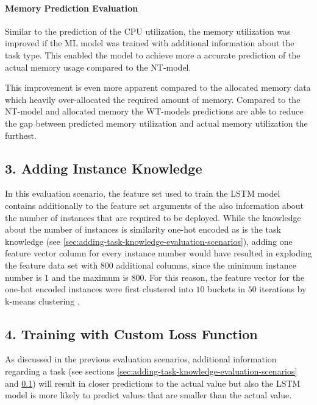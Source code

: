     \paragraph{Memory Prediction Evaluation}
    \label{par:memory-prediction-evaluation-task-knowledge}

      Similar to the prediction of the CPU utilization, the memory utilization was improved if the ML model was trained with additional information about the task type. This enabled the model to achieve more a accurate prediction of the actual memory usage compared to the NT-model.

      This improvement is even more apparent compared to the allocated memory data which heavily over-allocated the required amount of memory. Compared to the NT-model and allocated memory the WT-models predictions are able to reduce the gap between predicted memory utilization and actual memory utilization the furthest.

  \subsection{3. Adding Instance Knowledge}
  \label{sec:adding-instance-knowledge-evaluation-scenarios}

    In this evaluation scenario, the feature set used to train the LSTM model contains additionally to the feature set arguments of the  also information about the number of instances that are required to be deployed. While the knowledge about the number of instances is similarity one-hot encoded as is the task knowledge (see \ref{sec:adding-task-knowledge-evaluation-scenarios}), adding one feature vector column for every instance number would have resulted in exploding the feature data set with 800 additional columns, since the minimum instance number is $1$ and the maximum is $800$.
    For this reason, the feature vector for the one-hot encoded instances were first clustered into $10$ buckets in $50$ iterations by k-means clustering \cite{hartiganAlgorithm136Kmeans1979}.

  \subsection{4. Training with Custom Loss Function}
  \label{sec:training-with-custom-loss-function-evaluation-scenarios}

      As discussed in the previous evaluation scenarios, 
      additional information regarding a task (see sections \ref{sec:adding-task-knowledge-evaluation-scenarios} and \ref{sec:adding-instance-knowledge-evaluation-scenarios}) will result in closer predictions to the actual value but also the LSTM model is more likely to predict values that are smaller than the actual value.
      

